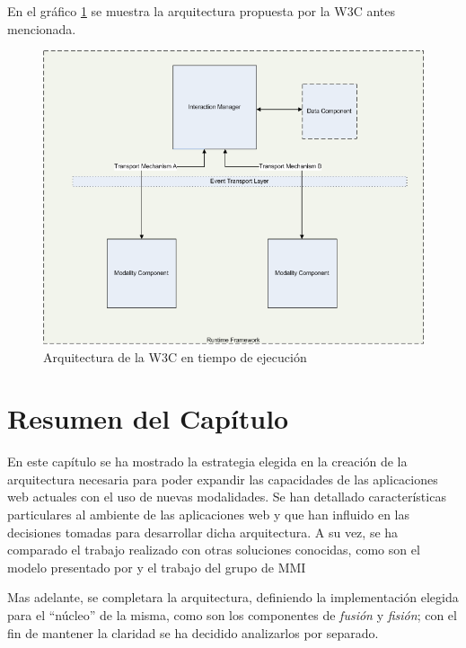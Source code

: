 En el gráfico \ref{fig:arq_others_w3c} se muestra la arquitectura propuesta por la W3C antes mencionada.
\begin{center}
  \begin{figure}[h!]
    \includegraphics[scale=1,width=\textwidth]{gfx/w3c_RevisedArchDiagram}
    \caption{Arquitectura de la W3C en tiempo de ejecución}
    \label{fig:arq_others_w3c}
  \end{figure}
\end{center}
\large

\hfill
\vfill

\section{Resumen del Capítulo} \label{sec:infra_summary}
En este capítulo se ha mostrado la estrategia elegida en la creación de la arquitectura necesaria para poder expandir las capacidades de las aplicaciones web actuales con el uso de nuevas modalidades. Se han detallado características particulares al ambiente de las aplicaciones web y que han influido en las decisiones tomadas para desarrollar dicha arquitectura. A su vez, se ha comparado el trabajo realizado con otras soluciones conocidas, como son el modelo presentado por \citet{dumas2009multimodal} y el trabajo del grupo de MMI \citet{w3c:mmiarch}

Mas adelante, se completara la arquitectura, definiendo la implementación elegida para el ``núcleo'' de la misma, como son los componentes de \emph{fusión} y \emph{fisión}; con el fin de mantener la claridad se ha decidido analizarlos por separado.


